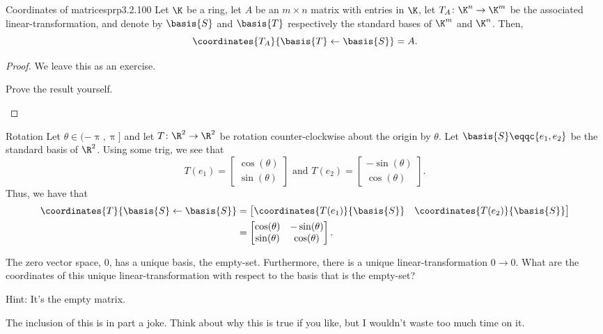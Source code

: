 \begin{prp}{Coordinates of matrices}{prp3.2.100}
	Let $\K$ be a ring, let $A$ be an $m\times n$ matrix with entries in $\K$, let $T_A\colon \K ^n\rightarrow \K ^m$ be the associated linear-transformation, and denote by $\basis{S}$ and $\basis{T}$ respectively the standard bases of $\K ^m$ and $\K ^n$.  Then,
	\begin{equation}
		\coordinates{T_A}{\basis{T}\leftarrow \basis{S}}=A.
	\end{equation}
	\begin{proof}
		We leave this as an exercise.
		\begin{exr}[breakable=false]{}{}
			Prove the result yourself.
		\end{exr}
	\end{proof}
\end{prp}
\begin{exm}{Rotation}{}
	Let $\theta \in (-\uppi ,\uppi ]$ and let $T\colon \R ^2\rightarrow \R ^2$ be rotation counter-clockwise about the origin by $\theta$.  Let $\basis{S}\eqqc \{ e_1,e_2\}$ be the standard basis of $\R ^2$.  Using some trig, we see that
	\begin{equation}
		T(e_1)=\begin{bmatrix}\cos (\theta ) \\ \sin (\theta )\end{bmatrix}\text{ and }T(e_2)=\begin{bmatrix}-\sin (\theta ) \\ \cos (\theta )\end{bmatrix}.
	\end{equation}
	Thus, we have that
	\begin{equation}
		\begin{split}
			\coordinates{T}{\basis{S}\leftarrow \basis{S}} & =\begin{bmatrix}\coordinates{T(e_1)}{\basis{S}} & \coordinates{T(e_2)}{\basis{S}}\end{bmatrix} \\
			& =\begin{bmatrix}\cos (\theta ) & -\sin (\theta ) \\ \sin (\theta ) & \cos (\theta )\end{bmatrix}.
		\end{split}
	\end{equation}
\end{exm}
\begin{exr}{}{}
	The zero vector space, $0$, has a unique basis, the empty-set.  Furthermore, there is a unique linear-transformation $0\rightarrow 0$.  What are the coordinates of this unique linear-transformation with respect to the basis that is the empty-set?
	\begin{rmk}
		Hint:  It's the empty matrix.
	\end{rmk}
	\begin{rmk}
		The inclusion of this is in part a joke.  Think about why this is true if you like, but I wouldn't waste too much time on it.
	\end{rmk}
\end{exr}
